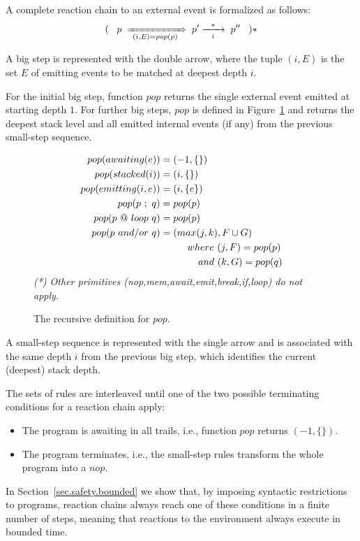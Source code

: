 A complete reaction chain to an external event is formalized as follows:
%
$$
(\;\;\;
p                                        \;
    \xRightarrow[~(i,E)=pop(p)~]{}     \;
p'
    \xrightarrow[~~i~~]{~~*~~}           \;
p''
\;\;\;)*
$$

A big step is represented with the double arrow, where the tuple $(i,E)$ is the 
set $E$ of emitting events to be matched at deepest depth $i$.

For the initial big step, function $pop$ returns the single external event 
emitted at starting depth $1$.
For further big steps, $pop$ is defined in Figure~\ref{fig:pop} and returns the 
deepest stack level and all emitted internal events (if any) from the previous 
small-step sequence.
%

\begin{figure}[t]
{\small
\begin{align*}
  pop(awaiting(e))   &= (-1, \{\})              \\
  pop(stacked(i))    &= ( i, \{\})              \\
  pop(emitting(i,e)) &= ( i, \{e\})             \\
  pop(p~;~q)         &= pop(p)                  \\
  pop(p~@~loop~q)    &= pop(p)                  \\
  pop(p~and/or~q)    &= (max(j,k), F\cup{}G)    \\
                     & \;\;\;\;\;\;\;\;\;\; where~(j,F)=pop(p)  \\
                     & \;\;\;\;\;\;\;\;\;\;\;\;\;\; and~(k,G)=pop(q)
\end{align*}
\emph{(*) Other primitives (nop,mem,await,emit,break,if,loop) do not apply.}
}%
\caption{ The recursive definition for $pop$.
\label{fig:pop}
}
\end{figure}

A small-step sequence is represented with the single arrow and is associated 
with the same depth $i$ from the previous big step, which identifies the 
current (deepest) stack depth.

The sets of rules are interleaved until one of the two possible terminating 
conditions for a reaction chain apply:

\begin{itemize}
\item The program is awaiting in all trails, i.e., function $pop$ returns 
$(-1,\{\})$.
\item The program terminates, i.e., the small-step rules transform the whole 
program into a $nop$.
\end{itemize}
%
In Section~\ref{sec.safety.bounded} we show that, by imposing syntactic 
restrictions to programs, reaction chains always reach one of these conditions 
in a finite number of steps, meaning that reactions to the environment always 
execute in bounded time.

